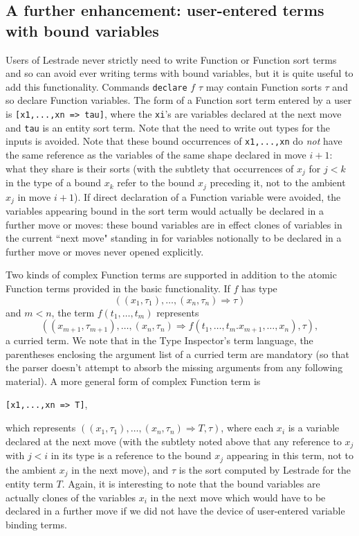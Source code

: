 \documentclass{article}
\begin{document}
\subsection{A further enhancement:  user-entered terms with bound variables}

Users of Lestrade never strictly need to write Function or Function sort terms and so can avoid ever writing terms with bound variables, but it is quite useful to add this functionality.  Commands {\tt declare} $f$ $\tau$ may contain Function sorts $\tau$ and so declare Function variables.  The form of a Function sort term entered by a user is {\tt [x1,...,xn => tau]}, where the {\tt xi}'s are variables declared at the next move and {\tt tau} is an entity sort term.  Note that the need to write out types for the inputs is avoided.  Note that these bound occurrences of {\tt x1,...,xn} do {\em not\/} have the same reference as the variables of the same shape declared in move $i+1$:  what they share is their sorts (with the subtlety that occurrences of $x_j$ for $j<k$ in the type of a bound $x_k$ refer to the bound $x_j$ preceding it, not to the ambient $x_j$ in move $i+1$).  If direct declaration of a Function variable were avoided, the variables appearing bound in the sort term would actually be declared in a further move or moves:  these bound variables are in effect clones of variables in the current ``next move" standing in for variables notionally to be declared in a further move or moves never opened explicitly.

Two kinds of complex Function terms are supported in addition to the atomic Function terms provided in the basic functionality.  If $f$ has
type $$((x_1,\tau_1),\ldots,(x_n,\tau_n) \Rightarrow \tau)$$ and $m<n$, the term $f(t_1,\ldots,t_m)$ represents
$$((x_{m+1},\tau_{m+1}),\ldots,(x_n,\tau_n) \Rightarrow f(t_1,\ldots,t_m.x_{m+1},\ldots,x_n),\tau),$$ a curried term.  We note that in the Type Inspector's term language, the parentheses enclosing the argument list of a curried term are mandatory (so that the parser doesn't attempt to absorb the missing arguments from any following material).  A more general form of complex Function term is \begin{center}{\tt [x1,...,xn => T]},\end{center}which represents
$((x_1,\tau_1),\ldots,(x_n,\tau_n) \Rightarrow T,\tau)$, where each $x_i$ is a variable declared at the next move (with the subtlety noted above that
any reference to $x_j$ with $j<i$ in its type is a reference to the bound $x_j$ appearing in this term, not to the ambient $x_j$ in the next move), and $\tau$ is the sort computed by Lestrade for the entity term $T$.  Again, it is interesting to note that the bound variables are actually clones of the variables $x_i$ in the next move which would have to be declared in a further move if we did not have the device of user-entered variable binding terms.
\end{document}

